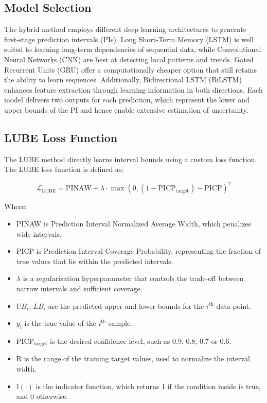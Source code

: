 \subsection{Model Selection}
The hybrid method employs different deep learning architectures to generate first-stage prediction intervals (PIs). Long Short-Term Memory (LSTM) is well suited to learning long-term dependencies of sequential data, while Convolutional Neural Networks (CNN) are best at detecting local patterns and trends. Gated Recurrent Units (GRU) offer a computationally cheaper option that still retains the ability to learn sequences. Additionally, Bidirectional LSTM (BiLSTM) enhances feature extraction through learning information in both directions. Each model delivers two outputs for each prediction, which represent the lower and upper bounds of the PI and hence enable extensive estimation of uncertainty.

\subsection{LUBE Loss Function}
The LUBE method directly learns interval bounds using a custom loss function. The LUBE loss function is defined as:

\begin{equation}
\mathcal{L}_{\text{LUBE}} = \text{PINAW} + \lambda \cdot \max\left(0,\left(1 - \text{PICP}_{\text{target}}\right) - \text{PICP} \right)^2
\label{LUBE Loss Function}
\end{equation}

Where:
\begin{itemize}
    \item PINAW is Prediction Interval Normalized Average Width, which penalizes wide intervals.
    
    \item PICP is Prediction Interval Coverage Probability, representing the fraction of true values that lie within the predicted intervals.
    
    \item $\lambda$ is a regularization hyperparameter that controls the trade-off between narrow intervals and sufficient coverage.
    
    \item $UB_i$, $LB_i$ are the predicted upper and lower bounds for the $i^{\text{th}}$ data point.
    
    \item $y_i$ is the true value of the $i^{\text{th}}$ sample.
    
    \item $\text{PICP}_{\text{target}}$ is the desired confidence level, such as 0.9, 0.8, 0.7 or 0.6.
    
    \item R is the range of the training target values, used to normalize the interval width.
    
    \item $\mathbb{I}(\cdot)$ is the indicator function, which returns 1 if the condition inside is true, and 0 otherwise.
\end{itemize}

